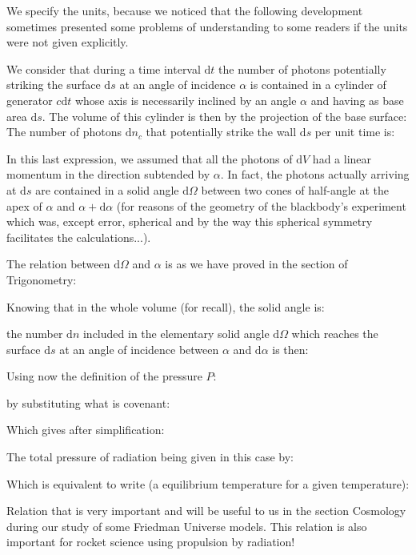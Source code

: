 \begin{dem}
	\begin{tcolorbox}[title=Remark,colframe=black,arc=10pt]
	We specify the units, because we noticed that the following development sometimes presented some problems of understanding to some readers if the units were not given explicitly.
	\end{tcolorbox}
	We consider that during a time interval $\mathrm{d}t$ the number of photons potentially striking the surface $\mathrm{d}s$ at an angle of incidence $\alpha$ is contained in a cylinder of generator $c\mathrm{d}t$ whose axis is necessarily inclined by an angle $\alpha$ and having as base area $\mathrm{d}s$. The volume of this cylinder is then by the projection of the base surface:
	The number of photons $\mathrm{d}n_c$ that potentially strike the wall $\mathrm{d}s$ per unit time is:
	
	In this last expression, we assumed that all the photons of $\mathrm{d}V$ had a linear momentum  in the direction subtended by $\alpha$. In fact, the photons actually arriving at $\mathrm{d}s$ are contained in a solid angle $\mathrm{d}\Omega$ between two cones of half-angle at the apex of $\alpha$ and $\alpha+\mathrm{d}\alpha$ (for reasons of the geometry of the blackbody's experiment which was, except error, spherical and by the way this spherical symmetry facilitates the calculations...).

	The relation between $\mathrm{d}\Omega$ and $\alpha$ is as we have proved in the section of Trigonometry:
	
	Knowing that in the whole volume (for recall), the solid angle is:
	
	the number $\mathrm{d}n$ included in the elementary solid angle $\mathrm{d}\Omega$ which reaches the surface $\mathrm{d}s$ at an angle of incidence between $\alpha$ and $\mathrm{d}\alpha$ is then:
	
	Using now the definition of the pressure $P$:
 	
	by substituting what is covenant:
	
	Which gives after simplification:
	
	The total pressure of radiation being given in this case by:
	
	Which is equivalent to write (a equilibrium temperature for a given temperature):
	
	Relation that is very important and will be useful to us in the section Cosmology during our study of some Friedman Universe models. This relation is also important for rocket science using propulsion by radiation!


\end{dem}
